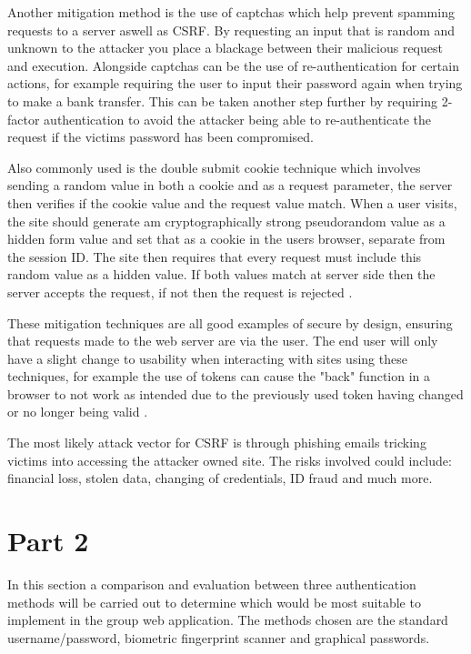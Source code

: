\documentclass{ueacmpstyle}
\begin{document}
      Another mitigation method is the use of captchas which help prevent spamming requests 
      to a server aswell as CSRF. By requesting an input that is random and unknown to the 
      attacker you place a blackage between their malicious request and execution. 
      Alongside captchas can be the use of re-authentication for certain actions, for example 
      requiring the user to input their password again when trying to make a bank transfer. 
      This can be taken another step further by requiring 2-factor authentication to avoid 
      the attacker being able to re-authenticate the request if the victims password has been 
      compromised.

      Also commonly used is the double submit cookie technique which involves sending a random 
      value in both a cookie and as a request parameter, the server then verifies if the 
      cookie value and the request value match. When a user visits, the site should generate 
      am cryptographically strong pseudorandom value as a hidden form value and set that as 
      a cookie in the users browser, separate from the session ID. The site then requires that 
      every request must include this random value as a hidden value. If both values match at 
      server side then the server accepts the request, if not then the request is rejected 
      \citep{OWASPCSRFPrevention}.

      These mitigation techniques are all good examples of secure by design, ensuring that 
      requests made to the web server are via the user. The end user will only have a slight 
      change to usability when interacting with sites using these techniques, for example the 
      use of tokens can cause the "back" function in a browser to not work as intended due to 
      the previously used token having changed or no longer being valid \citep{OWASPCSRFPrevention}.
      
      The most likely attack vector for CSRF is through phishing emails tricking victims into 
      accessing the attacker owned site. The risks involved could include: financial loss, 
      stolen data, changing of credentials, ID fraud and much more. 
        
    \section{Part 2}\label{sec:Pt2}
    In this section a comparison and evaluation between three authentication methods will 
    be carried out to determine which would be most suitable to implement in the group web 
    application. The methods chosen are the standard username/password, biometric 
    fingerprint scanner and graphical passwords.
    
\end{document}
